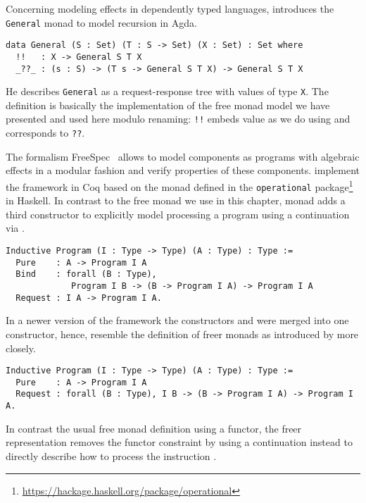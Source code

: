 Concerning modeling effects in dependently typed languages, \citet{mcbride2015turingcompleteness} introduces the \texttt{General} monad to model recursion in Agda.

\begin{verbatim}
data General (S : Set) (T : S -> Set) (X : Set) : Set where
  !!   : X -> General S T X
  _??_ : (s : S) -> (T s -> General S T X) -> General S T X
\end{verbatim}

He describes \texttt{General} as a request-response tree with values of type \texttt{X}.
The definition is basically the implementation of the free monad model we have presented and used here modulo renaming: \texttt{!!} embeds value as we do using  and  corresponds to \texttt{??}.

The formalism FreeSpec~\citep{letan2018modular} allows to model components as programs with algebraic effects in a modular fashion and verify properties of these components.
\citeauthor{letan2018modular} implement the framework in Coq based on the  monad defined in the \texttt{operational} package\footnote{\url{https://hackage.haskell.org/package/operational}} in Haskell.
In contrast to the free monad we use in this chapter,  monad adds a third constructor to explicitly model processing a program using a continuation via .

\begin{verbatim}
Inductive Program (I : Type -> Type) (A : Type) : Type :=
  Pure    : A -> Program I A
  Bind    : forall (B : Type),
             Program I B -> (B -> Program I A) -> Program I A
  Request : I A -> Program I A.
\end{verbatim}

In a newer version of the framework the constructors  and  were merged into one constructor, hence, resemble the definition of freer monads as introduced by \citet{kiselyov2015freer} more closely.

\begin{verbatim}
Inductive Program (I : Type -> Type) (A : Type) : Type :=
  Pure    : A -> Program I A
  Request : forall (B : Type), I B -> (B -> Program I A) -> Program I A.
\end{verbatim}

In contrast the usual free monad definition using a functor, the freer representation removes the functor constraint by using a continuation  instead to directly describe how to process the instruction .

